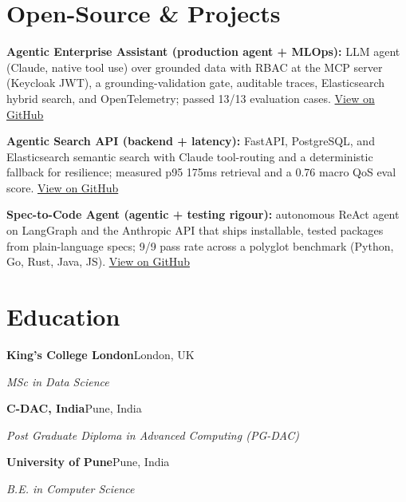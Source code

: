 \documentclass[10pt,a4paper]{article}
\begin{document}
\section{Open-Source \& Projects}
\begin{tight}
  \item \textbf{Agentic Enterprise Assistant (production agent + MLOps):} LLM agent (Claude, native tool use) over grounded data with RBAC at the MCP server (Keycloak JWT), a grounding-validation gate, auditable traces, Elasticsearch hybrid search, and OpenTelemetry; passed 13/13 evaluation cases. \href{https://github.com/abhijeetscode/Agentic-Enterprise-Assistant}{View on GitHub}
  \item \textbf{Agentic Search API (backend + latency):} FastAPI, PostgreSQL, and Elasticsearch semantic search with Claude tool-routing and a deterministic fallback for resilience; measured p95 175ms retrieval and a 0.76 macro QoS eval score. \href{https://github.com/abhijeetscode/search-agent}{View on GitHub}
  \item \textbf{Spec-to-Code Agent (agentic + testing rigour):} autonomous ReAct agent on LangGraph and the Anthropic API that ships installable, tested packages from plain-language specs; 9/9 pass rate across a polyglot benchmark (Python, Go, Rust, Java, JS). \href{https://github.com/abhijeetscode/Spec-to-Code-Agent}{View on GitHub}
\end{tight}

\section{Education}
{\color{company}\bfseries King's College London}\hfill {\color{muted}London, UK}\par
{\itshape MSc in Data Science}\par\vspace{2pt}
{\color{company}\bfseries C-DAC, India}\hfill {\color{muted}Pune, India}\par
{\itshape Post Graduate Diploma in Advanced Computing (PG-DAC)}\par\vspace{2pt}
{\color{company}\bfseries University of Pune}\hfill {\color{muted}Pune, India}\par
{\itshape B.E. in Computer Science}\par
\end{document}

